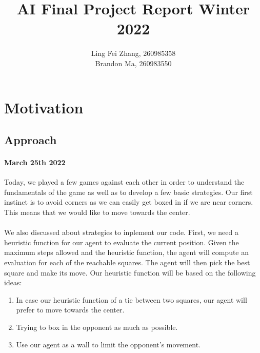 \documentclass[12pt,a4paper]{article}
\author{Ling Fei Zhang, 260985358\\
Brandon Ma, 260983550}
\begin{document}
\title{AI Final Project Report Winter 2022}    
\maketitle
\section{Motivation}
\subsection{Approach}
\paragraph{March 25th 2022}
Today, we played a few games against each other in order to understand the fundamentals 
of the game as well as to develop a few basic strategies. Our first instinct is to avoid 
corners as we can easily get boxed in if we are near corners. This means that we would 
like to move towards the center. 
\paragraph{} We also discussed about strategies to inplement our code. First, we need a 
heuristic function for our agent to evaluate the current position. Given the maximum steps 
allowed and the heuristic function, the agent will compute an evaluation for each of the 
reachable squares. The agent will then pick the best square and make its move. Our heuristic 
function will be based on the following ideas:
\begin{enumerate}
    \item In case our heuristic function of a tie between two squares, our agent will prefer to move towards the center.
    \item Trying to box in the opponent as much as possible.
    \item Use our agent as a wall to limit the opponent's movement.
\end{enumerate}
\end{document}
